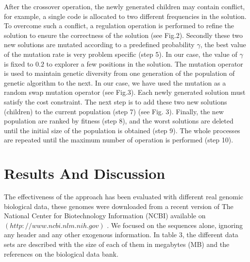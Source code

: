 \documentclass[preprint,12pt]{elsarticle}%
\begin{document}
After the crossover operation, the newly generated children may contain conflict, for example, a single code is allocated to two different frequencies in the solution. To overcome such a conflict, a regulation operation is performed to refine the solution to ensure the correctness of the solution (see Fig.2).
 Secondly these two new solutions are mutated according to a predefined probability $\gamma$, the best value of the mutation rate is very problem specific (step 5). In our case, the value of $\gamma$ is fixed to $0.2$ to explorer a few positions in the solution. The mutation operator is used to maintain genetic diversity from one generation of the population of genetic algorithm to the next. In our case, we have used the mutation as a random swap mutation operator (see Fig.3).  Each newly generated solution must satisfy the cost constraint. The next step is to add these two new solutions (children) to the current population (step 7) (see Fig. 3). Finally, the new population are ranked by fitness (step 8), and the worst solutions are deleted until the initial size of the population is obtained  (step 9). The whole processes are repeated until the maximum number of operation is performed (step 10). 


\section{Results And Discussion}
\label{sec4}
The effectiveness of the approach has been evaluated with different real genomic biological data, these genomes were downloaded from a recent version of The National Center for Biotechnology Information (NCBI) available on $(http://www.ncbi.nlm.nih.gov)$ \cite{pruitt2009ncbi}. We focused on the sequences alone, ignoring any header and any other exogenous information. In table 3, the different data sets are described with the size  of each of them in megabytes (MB) and the references on the biological data bank.
\end{document}
